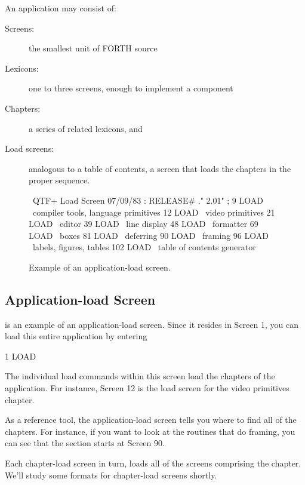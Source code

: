 An application may consist of:
\begin{description}
\item[Screens:] the smallest unit of FORTH source
\item[Lexicons:] one to three screens, enough to implement a component
\item[Chapters:] a series of related lexicons, and
\item[Load screens:] analogous to a table of contents, a screen that loads the
chapters in the proper sequence.
\end{description}
\begin{figure*}[tttt]
\caption{Example of an application-load screen.}
\setcounter{screen}{1}
\begin{Screen}
\ QTF+ Load Screen   07/09/83
: RELEASE#   ." 2.01" ;
  9 LOAD \ compiler tools, language primitives
 12 LOAD \ video primitives
 21 LOAD \ editor
 39 LOAD \ line display
 48 LOAD \ formatter
 69 LOAD \ boxes
 81 LOAD \ deferring
 90 LOAD \ framing
 96 LOAD \ labels, figures, tables
102 LOAD \ table of contents generator




\end{Screen}
\end{figure*}

{\othersidetrue\subsection{Application-load Screen}}

 is an example of an application-load screen.  Since it resides in
Screen 1, you can load this entire application by entering
\begin{Code}
1 LOAD
\end{Code}
The individual load commands within this screen load the chapters of the
application.  For instance, Screen 12 is the load screen for the video
primitives chapter.

As a reference tool, the application-load screen tells you where to
find all of the chapters.  For instance, if you want to look at the routines
that do framing, you can see that the section starts at Screen 90.

Each chapter-load screen in turn, loads all of the screens comprising
the chapter.  We'll study some formats for chapter-load screens shortly.

